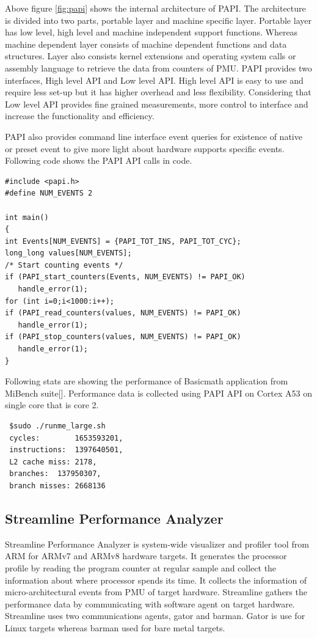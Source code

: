 \par Above figure \ref{fig:papi} shows the internal architecture of PAPI. The architecture is divided into two parts, portable layer and machine specific layer. Portable layer has low level, high level and machine independent support functions. Whereas machine dependent layer consists of machine dependent functions and data structures. Layer also consists kernel extensions and operating system calls or assembly language to retrieve the data from counters of PMU. PAPI provides two interfaces, High level API and Low level API. High level API is easy to use and require less set-up but it has higher overhead and less flexibility. Considering that Low level API provides fine grained measurements, more control to interface and increase the functionality and efficiency. 

\par PAPI also provides command line interface event queries for existence of native or preset event to give more light about hardware supports specific events. Following code shows the PAPI API calls in code.  

\begin{lstlisting}
#include <papi.h>
#define NUM_EVENTS 2 

int main()
{
int Events[NUM_EVENTS] = {PAPI_TOT_INS, PAPI_TOT_CYC};
long_long values[NUM_EVENTS];
/* Start counting events */
if (PAPI_start_counters(Events, NUM_EVENTS) != PAPI_OK)
   handle_error(1); 
for (int i=0;i<1000:i++); 
if (PAPI_read_counters(values, NUM_EVENTS) != PAPI_OK)
   handle_error(1);
if (PAPI_stop_counters(values, NUM_EVENTS) != PAPI_OK)
   handle_error(1);
}
\end{lstlisting}

\par Following stats are showing the performance of Basicmath application from MiBench suite[]. Performance data is collected using PAPI API on Cortex A53 on single core that is core 2. 
\begin{lstlisting}
 $sudo ./runme_large.sh
 cycles:		1653593201,
 instructions:	1397640501,
 L2 cache miss:	2178,
 branches:	137950307,
 branch misses:	2668136
\end{lstlisting}

\subsection{Streamline Performance Analyzer}
Streamline Performance Analyzer is system-wide visualizer and profiler tool from ARM for ARMv7 and ARMv8 hardware targets. It generates the processor profile by reading the program counter at regular sample and collect the information about where processor spends its time. It collects the information of micro-architectural events from PMU of target hardware. Streamline gathers the performance data by communicating with software agent on target hardware. Streamline uses two communications agents, gator and barman. Gator is use for Linux targets whereas barman used for bare metal targets. 

